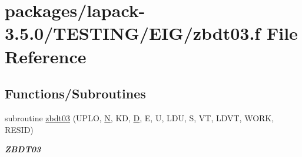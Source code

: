 \hypertarget{zbdt03_8f}{}\section{packages/lapack-\/3.5.0/\+T\+E\+S\+T\+I\+N\+G/\+E\+I\+G/zbdt03.f File Reference}
\label{zbdt03_8f}
\subsection*{Functions/\+Subroutines}
\begin{DoxyCompactItemize}
\item 
subroutine \hyperlink{group__complex16__eig_ga9fb67a93383bedd0a2573cc1e4e38008}{zbdt03} (U\+P\+L\+O, \hyperlink{polmisc_8c_a0240ac851181b84ac374872dc5434ee4}{N}, K\+D, \hyperlink{odrpack_8h_a7dae6ea403d00f3687f24a874e67d139}{D}, E, U, L\+D\+U, S, V\+T, L\+D\+V\+T, W\+O\+R\+K, R\+E\+S\+I\+D)
\begin{DoxyCompactList}\small\item\em {\bfseries Z\+B\+D\+T03} \end{DoxyCompactList}\end{DoxyCompactItemize}
